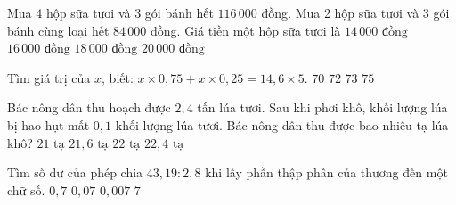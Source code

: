 \begin{ex} %
Mua 4 hộp sữa tươi và 3 gói bánh hết $116\,000$ đồng. Mua 2 hộp sữa tươi và 3 gói bánh cùng loại hết $84\,000$ đồng. Giá tiền một hộp sữa tươi là
\choice
{$14\,000\text{ đồng}$}
{\True $16\,000\text{ đồng}$}
{$18\,000\text{ đồng}$}
{$20\,000\text{ đồng}$}
\end{ex}

\begin{ex} %
Tìm giá trị của $x$, biết: $x \times 0{,}75 + x \times 0{,}25 = 14{,}6 \times 5$.
\choice
{$70$}
{$72$}
{\True $73$}
{$75$}
\end{ex}

\begin{ex} %
Bác nông dân thu hoạch được $2{,}4$ tấn lúa tươi. Sau khi phơi khô, khối lượng lúa bị hao hụt mất $0{,}1$ khối lượng lúa tươi. Bác nông dân thu được bao nhiêu tạ lúa khô?
\choice
{$21\text{ tạ}$}
{\True $21{,}6\text{ tạ}$}
{$22\text{ tạ}$}
{$22{,}4\text{ tạ}$}
\end{ex}

\begin{ex} %
Tìm số dư của phép chia $43{,}19 : 2{,}8$ khi lấy phần thập phân của thương đến một chữ số.
\choice
{$0{,}7$}
{\True $0{,}07$}
{$0{,}007$}
{$7$}
\end{ex}

